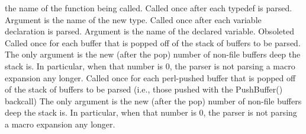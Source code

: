 the name of the function being called.
Called once after each typedef is parsed.  Argument is the name
of the new type.
Called once after each variable declaration is parsed.  Argument is the name
of the declared variable.
 Obsoleted
Called once for each buffer that is popped off of the stack of
buffers to be parsed. The only argument is the new (after the pop)
number of non-file buffers
deep the stack is.  In particular, when that number is 0, 
the parser is not parsing a macro expansion any longer.
Called once for each perl-pushed buffer that is popped off of the stack of
buffers to be parsed (i.e., those pushed with the PushBuffer() backcall)
The only argument is the new (after the pop)
number of non-file buffers
deep the stack is.  In particular, when that number is 0, 
the parser is not parsing a macro expansion any longer.

